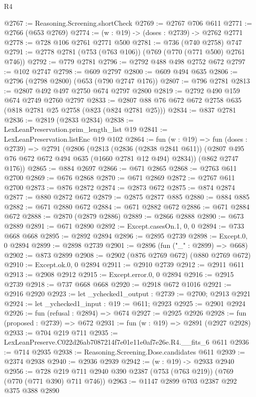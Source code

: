 \begin{lexlean}{R4}
\begin{coremodule}
@2767 := Reasoning.Screening.shortCheck
@2769 := @2767 @706 @611
@2771 := @2766 (@653 @2769)
@2774 := (w : @19) -> (doses : @2739) -> @2762 @2771
@2778 := @728 @106 @2761 @2771 @500
@2781 := @736 (@740 @2758) @747
@2791 := @2778 @2781 (@753 (@763 @106)) (@769 (@770 (@771 @500) @2761 @746))
@2792 := @779 @2781
@2796 := @2792 @488 @498 @2752 @672
@2797 := @102 @2747
@2798 := @609 @2797
@2800 := @609 @494 @635
@2806 := @2796 (@2798 @2800) (@653 (@790 @2747 @176))
@2807 := @796 @2781
@2813 := @2807 @492 @497 @2750 @674 @2797 @2800
@2819 := @2792 @490 @159 @674 @2749 @2760 @2797
@2833 := @2807 @88 @76 @672 @672 @2758 @635 (@818 @2781 @25 @2758 (@823 (@824 @2781 @25)))
@2834 := @837 @2781
@2836 := @2819 (@2833 @2834)
@2838 := LexLeanPreservation.prim_length_list @19
@2841 := LexLeanPreservation.listEnc @19 @102
@2864 := fun (w : @19) =>
  fun (doses : @2739) =>
  @2791
    (@2806
      (@2813
        (@2836 (@2838 @2841 @611))
        (@2807 @495 @76 @672 @672 @494 @635 (@1660 @2781 @12 @494) @2834))
      (@862 @2747 @176))
@2865 := @884 @2697
@2866 := @671 @2865
@2868 := @2763 @611 @2700
@2869 := @676 @2868
@2870 := @671 @2869
@2872 := @2767 @611 @2700
@2873 := @876 @2872
@2874 := @2873 @672
@2875 := @874 @2874
@2877 := @880 @2872 @672
@2879 := @2875 @2877 @885
@2880 := @884 @885
@2882 := @671 @2880 @672
@2884 := @671 @2882 @672
@2886 := @671 @2884 @672
@2888 := @2870 (@2879 @2886)
@2889 := @2866 @2888
@2890 := @673 @2889
@2891 := @671 @2890
@2892 := Except.casesOn.{1, 0, 0}
@2894 := @733 @668 @668
@2895 := @2892 @2894
@2896 := @2895 @2739
@2898 := Except.{0, 0} @2894
@2899 := @2898 @2739
@2901 := @2896 (fun ("_" : @2899) => @668)
@2902 := @873 @2899
@2908 := @2902 (@876 @2769 @672) (@880 @2769 @672)
@2910 := Except.ok.{0, 0} @2894
@2911 := @2910 @2739
@2912 := @2911 @611
@2913 := @2908 @2912
@2915 := Except.error.{0, 0} @2894
@2916 := @2915 @2739
@2918 := @737 @668 @668
@2920 := @2918 @672 @1016
@2921 := @2916 @2920
@2923 := let _ychecked1_output : @2739 := @2700; @2913 @2921
@2924 := let _ychecked1_input : @19 := @611; @2923
@2925 := @2901 @2924
@2926 := fun (refusal : @2894) => @674
@2927 := @2925 @2926
@2928 := fun (proposed : @2739) => @672
@2931 := fun (w : @19) => @2891 (@2927 @2928)
@2933 := @704 @219 @711
@2935 := LexLeanPreserve.C022d26ab7087214f7e01e11e0af7e26e.R4.__fits_6 @611
@2936 := @714 @2935
@2938 := Reasoning.Screening.Dose.candidates @611
@2939 := @2374 @2938
@2940 := @2936 @2939
@2942 := (w : @19) -> @2933 @2940
@2956 := @728 @219 @711 @2940 @390 @2387 (@753 (@763 @219)) (@769 (@770 (@771 @390) @711 @746))
@2963 := @1147 @2899 @703 @2387 @292 @375 @388 @2890

\end{coremodule}
\end{lexlean}

